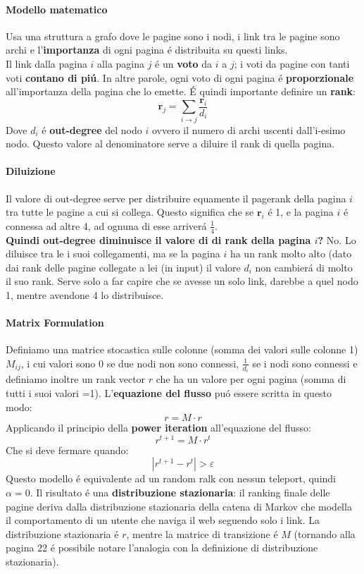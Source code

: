 \paragraph{Modello matematico} Usa una struttura a grafo dove le pagine sono i nodi, i link tra le pagine sono archi e l'\textbf{importanza} di ogni pagina é distribuita su questi links.
\\
Il link dalla pagina $i$ alla pagina $j$ é un \textbf{voto} da $i$ a $j$; i voti da pagine con tanti voti \textbf{contano di piú}. In altre parole, ogni voto di ogni pagina é \textbf{proporzionale} all'importanza della pagina che lo emette. É quindi importante definire un \textbf{rank}:
\[
\textbf{r}_j = \sum_{i \rightarrow j} \frac{\textbf{r}_i}{d_i}
\]
Dove $d_i$ é \textbf{out-degree} del nodo $i$ ovvero il numero di archi uscenti dall'i-esimo nodo. Questo valore al denominatore serve a diluire il rank di quella pagina. 

\paragraph{Diluizione} Il valore di out-degree serve per distribuire equamente il pagerank della pagina $i$ tra tutte le pagine a cui si collega. Questo significa che se $\textbf{r}_i$ é 1, e la pagina $i$ é connessa ad altre 4, ad ognuna di esse arriverá $\frac{1}{4}$.  
\\
\textbf{Quindi out-degree diminuisce il valore di di rank della pagina $i$?} No. Lo diluisce tra le i suoi collegamenti, ma se la pagina $i$ ha un rank molto alto (dato dai rank delle pagine collegate a lei (in input) il valore $d_i$ non cambierá di molto il suo rank. Serve solo a far capire che se avesse un solo link, darebbe a quel nodo 1, mentre avendone 4 lo distribuisce.

\paragraph{Matrix Formulation} Definiamo una matrice stocastica sulle colonne (somma dei valori sulle colonne 1) $M_{ij}$, i cui valori sono 0 se due nodi non sono connessi, $\frac{1}{d_i}$ se i nodi sono connessi e definiamo inoltre un rank vector $r$ che ha un valore per ogni pagina (somma di tutti i suoi valori =1). L'\textbf{equazione del flusso} puó essere scritta in questo modo:
\[
r = M \cdot r
\]
Applicando il principio della \textbf{power iteration} all'equazione del flusso:
\[
r^{t+1}= M \cdot r^t
\]
Che si deve fermare quando:
\[
|r^{t+1} - r^t| > \varepsilon
\]
Questo modello é equivalente ad un random ralk con nessun teleport, quindi $\alpha =0$. Il risultato é una \textbf{distribuzione stazionaria}: il ranking finale delle pagine deriva dalla distribuzione stazionaria della catena di Markov che modella il comportamento di un utente che naviga il web seguendo solo i link. La distribuzione stazionaria é $r$, mentre la matrice di transizione é $M$ (tornando alla pagina 22 é possibile notare l'analogia con la definizione di distribuzione stazionaria).
\newpage
